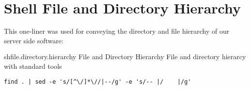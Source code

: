 \section{Shell File and Directory Hierarchy}
\label{section:source.code.hierarchy}

This one-liner was used for conveying the directory and file hierarchy of our
server side software:

\begin{scode}{sh}{file.directory.hierarchy}{%
   File and Directory Hierarchy}{%
  File and directory hierarcy with standard  tools}
\begin{lstlisting}
find . | sed -e 's/[^\/]*\//|--/g' -e 's/-- |/    |/g'
\end{lstlisting}
\end{scode}


